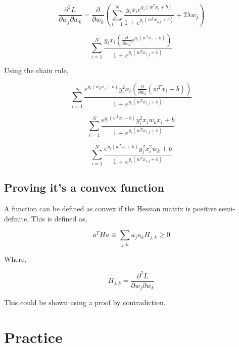 \documentclass[]{report}   %
\begin{document}
$$\frac{\partial^2 L}{\partial w_j\partial w_k}=\frac{\partial}{\partial w_k}(\sum_{i=1}^{N}\frac{y_ix_ie^{y_i(w^Tx_i+b)}}{1+e^{y_i(w^Tx_{i,j}+b)}}+2\lambda w_j)$$


$$\sum_{i=1}^{N}\frac{y_ix_i(\frac{\partial}{\partial w_k}e^{y_i(w^Tx_i+b)})}{1+e^{y_i(w^Tx_{i,j}+b)}}$$

Using the chain rule,

$$\sum_{i=1}^{N}\frac{e^{y_i(w_kx_i+b)}y_i^2x_i(\frac{\partial}{\partial w_k}(w^Tx_i+b))}{1+e^{y_i(w^Tx_{i,j}+b)}}$$

$$\sum_{i=1}^{N}\frac{e^{y_i(w^Tx_i+b)}y_i^2x_iw_kx_i+b}{1+e^{y_i(w^Tx_{i,j}+b)}}$$

$$\sum_{i=1}^{N}\frac{e^{y_i(w^Tx_i+b)}y_i^2x_i^2w_k+b}{1+e^{y_i(w^Tx_{i,j}+b)}}$$


\section{Proving it's a convex function}

A function can be defined as convex if the Hessian matrix is positive semi-definite. This is defined as,

$$a^THa\equiv\sum_{j,k}a_ja_kH_{j,k}\geq0$$

Where,

$$H_{j,k}=\frac{\partial^2L}{\partial w_j\partial w_k}$$

This could be shown using a proof by contradiction.

\chapter{Practice}
\end{document}
